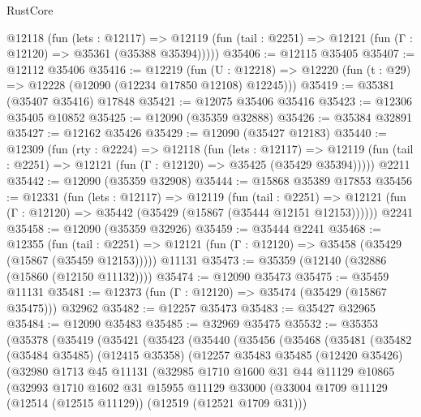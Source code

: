 \begin{lexlean}{RustCore}
\begin{coremodule}
    @12118
      (fun (lets : @12117) =>
      @12119 (fun (tail : @2251) => @12121 (fun (Γ : @12120) => @35361 (@35388 @35394)))))
@35406 := @12115 @35405
@35407 := @12112 @35406
@35416 := @12219
    (fun (U : @12218) => @12220 (fun (t : @29) => @12228 (@12090 (@12234 @17850 @12108) @12245)))
@35419 := @35381 (@35407 @35416) @17848
@35421 := @12075 @35406 @35416
@35423 := @12306 @35405 @10852
@35425 := @12090 (@35359 @32888)
@35426 := @35384 @32891
@35427 := @12162 @35426
@35429 := @12090 (@35427 @12183)
@35440 := @12309
    (fun (rty : @2224) =>
    @12118
      (fun (lets : @12117) =>
      @12119 (fun (tail : @2251) => @12121 (fun (Γ : @12120) => @35425 (@35429 @35394)))))
    @2211
@35442 := @12090 (@35359 @32908)
@35444 := @15868 @35389 @17853
@35456 := @12331
    (fun (lets : @12117) =>
    @12119
      (fun (tail : @2251) =>
      @12121 (fun (Γ : @12120) => @35442 (@35429 (@15867 (@35444 @12151 @12153))))))
    @2241
@35458 := @12090 (@35359 @32926)
@35459 := @35444 @2241
@35468 := @12355
    (fun (tail : @2251) => @12121 (fun (Γ : @12120) => @35458 (@35429 (@15867 (@35459 @12153)))))
    @11131
@35473 := @35359 (@12140 (@32886 (@15860 (@12150 @11132))))
@35474 := @12090 @35473
@35475 := @35459 @11131
@35481 := @12373 (fun (Γ : @12120) => @35474 (@35429 (@15867 @35475))) @32962
@35482 := @12257 @35473
@35483 := @35427 @32965
@35484 := @12090 @35483
@35485 := @32969 @35475
@35532 := @35353
    (@35378
      (@35419
        (@35421
          (@35423
            (@35440
              (@35456
                (@35468
                  (@35481
                    (@35482
                      (@35484 @35485)
                      (@12415 @35358)
                      (@12257
                        @35483
                        @35485
                        (@12420 @35426)
                        (@32980
                          @1713
                          @45
                          @11131
                          (@32985
                            @1710
                            @1600
                            @31
                            @44
                            @11129
                            @10865
                            (@32993
                              @1710
                              @1602
                              @31
                              @15955
                              @11129
                              @33000
                              (@33004
                                @1709
                                @11129
                                (@12514 (@12515 @11129))
                                (@12519 (@12521 @1709 @31)))

\end{coremodule}
\end{lexlean}
